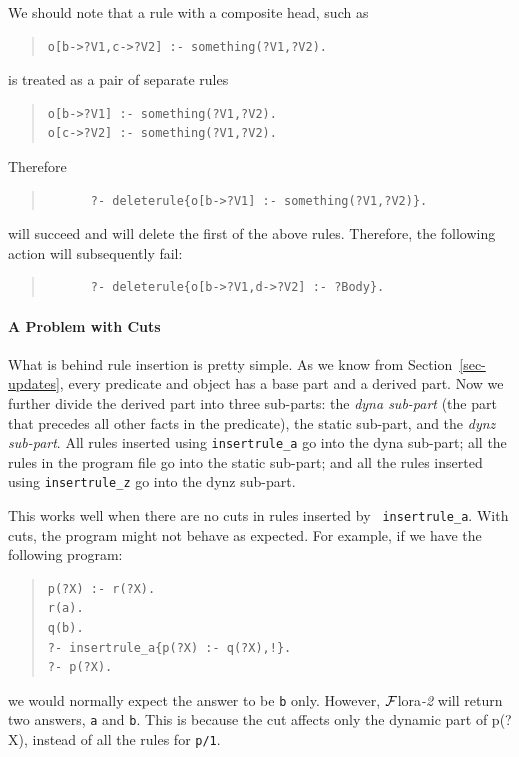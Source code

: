 \documentclass[11pt]{article}
\newcommand{\FLORA}{{\mbox{\sc ${\cal F}${lora}\rm\emph{-2}}}\xspace}
\begin{document}
We should note that a rule with a composite head, such as 
\begin{quote}
   \begin{verbatim}
o[b->?V1,c->?V2] :- something(?V1,?V2).     
   \end{verbatim}
\end{quote}
is treated as a pair of separate rules
\begin{quote}
\begin{verbatim}
o[b->?V1] :- something(?V1,?V2).     
o[c->?V2] :- something(?V1,?V2).     
\end{verbatim}
\end{quote}
Therefore
\begin{quote}
\begin{verbatim}
      ?- deleterule{o[b->?V1] :- something(?V1,?V2)}.
\end{verbatim}
\end{quote}
will succeed and will delete the first of the above rules.
Therefore, the following action will subsequently fail:
\begin{quote}
\begin{verbatim}
      ?- deleterule{o[b->?V1,d->?V2] :- ?Body}.
\end{verbatim}
\end{quote}



\paragraph{A Problem with Cuts} What is behind rule insertion is pretty
simple. As we know from Section~\ref{sec-updates}, every predicate and
object has a base part and a derived part. Now we further divide the
derived part into three sub-parts: the \emph{dyna sub-part} (the part that
precedes all other facts in the predicate), the static sub-part, and the
\emph{dynz sub-part}. All rules inserted using {\tt insertrule\_a} go into
the dyna sub-part; all the rules in the program file go into the static
sub-part; and all the rules inserted using {\tt insertrule\_z} go into the
dynz sub-part.

This works well when there are no cuts in rules inserted by {\tt
  insertrule\_a}. With cuts, the program might not
behave as expected. For example, if we have the following program:
\begin{quote}
\begin{verbatim}
p(?X) :- r(?X).
r(a).
q(b).
?- insertrule_a{p(?X) :- q(?X),!}.
?- p(?X).
\end{verbatim}
\end{quote}
\noindent
we would normally expect the answer to be {\tt b} only. However, \FLORA will
return two answers, {\tt a} and {\tt b}. This is because the cut affects
only the dynamic part of p(?X), instead of all the rules for {\tt p/1}.
\end{document}
